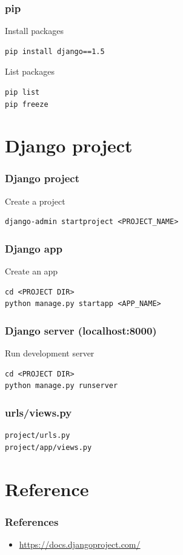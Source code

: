\documentclass[bigger, presentation]{beamer}
\begin{document}
\begin{frame}[fragile]
\frametitle{pip}
\label{sec-2-4}
\begin{block}{Install packages}
\label{sec-2-4-1}


\begin{verbatim}
pip install django==1.5
\end{verbatim}
\end{block}
\begin{block}{List packages}
\label{sec-2-4-2}


\begin{verbatim}
pip list
pip freeze
\end{verbatim}
\end{block}
\end{frame}
\section{Django project}
\label{sec-3}
\begin{frame}[fragile]
\frametitle{Django project}
\label{sec-3-1}
\begin{block}{Create a project}
\label{sec-3-1-1}


\begin{verbatim}
django-admin startproject <PROJECT_NAME>
\end{verbatim}
\end{block}
\end{frame}
\begin{frame}[fragile]
\frametitle{Django app}
\label{sec-3-2}
\begin{block}{Create an app}
\label{sec-3-2-1}


\begin{verbatim}
cd <PROJECT DIR>
python manage.py startapp <APP_NAME>
\end{verbatim}
\end{block}
\end{frame}
\begin{frame}[fragile]
\frametitle{Django server (localhost:8000)}
\label{sec-3-3}
\begin{block}{Run development server}
\label{sec-3-3-1}


\begin{verbatim}
cd <PROJECT DIR>
python manage.py runserver
\end{verbatim}
\end{block}
\end{frame}
\begin{frame}[fragile]
\frametitle{urls/views.py}
\label{sec-3-4}



\begin{verbatim}
project/urls.py
project/app/views.py
\end{verbatim}
\end{frame}
\section{Reference}
\label{sec-4}
\begin{frame}
\frametitle{References}
\label{sec-4-1}

\begin{itemize}
\item \href{https://docs.djangoproject.com/}{https://docs.djangoproject.com/}
\end{itemize}
\end{frame}
\end{document}
